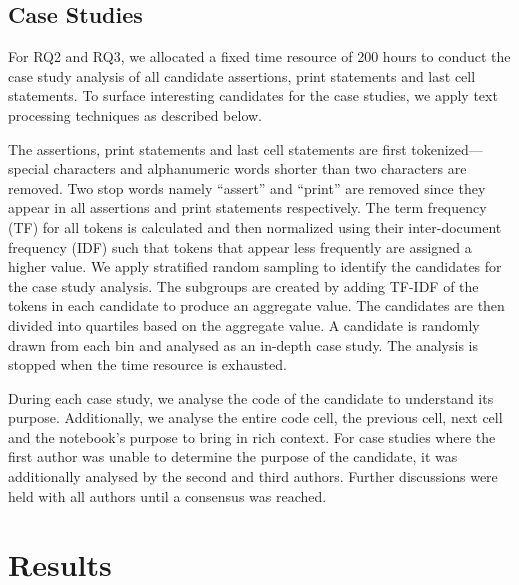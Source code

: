 \documentclass[smallextended]{svjour3}       %
\begin{document}
\subsection{Case Studies}

For RQ2 and RQ3, we allocated a fixed time resource of 200 hours to conduct the case study analysis of all candidate assertions, print statements and last cell statements. To surface interesting candidates for the case studies, we apply text processing techniques as described below.

The assertions, print statements and last cell statements are first tokenized---special characters and alphanumeric words shorter than two characters are removed. Two stop words namely ``assert'' and ``print'' are removed since they appear in all assertions and print statements respectively. The term frequency (TF) for all tokens is calculated and then normalized using their inter-document frequency (IDF) such that tokens that appear less frequently are assigned a higher value. We apply stratified random sampling to identify the candidates for the case study analysis. The subgroups are created by adding TF-IDF of the tokens in each candidate to produce an aggregate value. The candidates are then divided into quartiles based on the aggregate value. A candidate is randomly drawn from each bin and analysed as an in-depth case study. The analysis is stopped when the time resource is exhausted.

During each case study, we analyse the code of the candidate to understand its purpose. Additionally, we analyse the entire code cell, the previous cell, next cell and the notebook's purpose to bring in rich context. For case studies where the first author was unable to determine the purpose of the candidate, it was additionally analysed by the second and third authors. Further discussions were held with all authors until a consensus was reached.

\section{Results}
\end{document}
